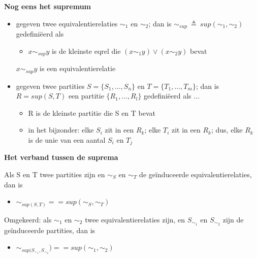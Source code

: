 \documentclass{seminar}
\newcommand{\openpagina}{}
\begin{document}
\begin{slide}

{\bf Nog eens het supremum}

\begin{itemize}
\item gegeven twee equivalentierelaties $\sim_1$ en $\sim_2$; dan is
$\sim_{sup}~\triangleq~sup(\sim_1,\sim_2)$ gedefini\"eerd als
\begin{itemize}
\item[] $x \sim_{sup} y$ is de kleinste eqrel die $(x \sim_1 y) \vee (x \sim_2 y)$ bevat
\end{itemize}
$x \sim_{sup} y$ is een equivalentierelatie

\item gegeven twee partities $S = \{S_1,...,S_n\}$ en $T = \{T_1,...,T_m\}$;
dan is $R = sup(S,T)$ een partitie $\{R_1,...,R_l\}$ gedefini\"eerd als ...
\begin{itemize}
\item[] R is de kleinste partitie die S en T bevat
\item[] in het bijzonder: elke $S_i$ zit in een $R_k$; elke $T_i$ zit
in een $R_k$; dus, elke $R_k$ is de unie van een aantal $S_i$ en $T_j$
\end{itemize}

\end{itemize}


\end{slide} \openpagina

\begin{slide}
{\bf Het verband tussen de suprema}

Als S en T twee partities zijn en $\sim_S$ en $\sim_T$ de
ge\"induceerde equivalentierelaties, dan is

\begin{itemize}
\item[]$\sim_{sup(S,T)} == sup(\sim_S,\sim_T)$
\end{itemize}



Omgekeerd: als $\sim_1$ en $\sim_2$ twee equivalentierelaties zijn,
en $S_{\sim_1}$ en $S_{\sim_2}$ zijn de ge\"induceerde partities, dan is

\begin{itemize}
\item[] $\sim_{sup(S_{\sim_1},S_{\sim_2}}) == sup(\sim_1,\sim_2)$
\end{itemize}

\end{slide} \openpagina
\end{document}
